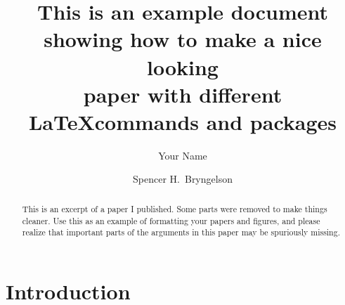 \documentclass[11pt,sort&compress]{elsarticle}
\begin{document}
\hypersetup{
  linkcolor=darkrust,
  citecolor=seagreen,
  urlcolor=darkrust,
  pdfauthor=author,
}

\begin{frontmatter}

\title{{\large\bfseries This is an example document showing how to make a nice looking \\ paper with different \LaTeX commands and packages}}

\author[1]{Your Name}
\author[2,3]{Spencer H.\ Bryngelson}

\address[1]{Some other School, Georgia Institute of Technology, Atlanta, GA 30332, USA\vspace{-0.15cm}}
\address[2]{Daniel Guggenheim School of Aerospace Engineering, Georgia Institute of Technology, Atlanta, GA 30332, USA\vspace{-0.15cm}}
\address[3]{School of Computational Science \& Engineering, Georgia Institute of Technology, Atlanta, GA 30332, USA}

\date{}

\end{frontmatter}

\begin{abstract}
    This is an excerpt of a paper I published.
    Some parts were removed to make things cleaner.
    Use this as an example of formatting your papers and figures, and please realize that important parts of the arguments in this paper may be spuriously missing.
\end{abstract}

\section{Introduction}
\end{document}
